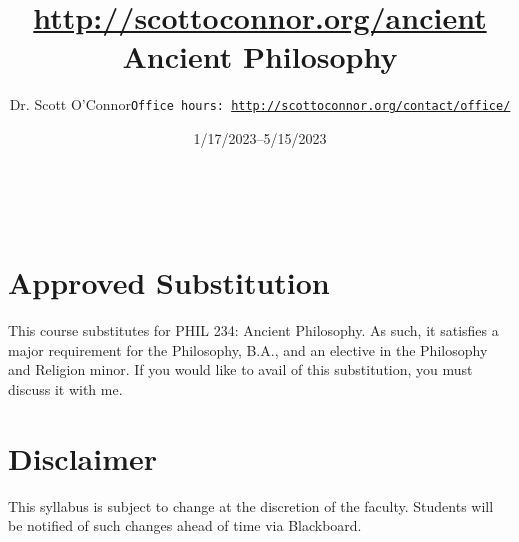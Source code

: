 \documentclass[article,oneside]{memoir}
\def\myauthor{Author}
\def\mytitle{Title}
\def\mycopyright{\myauthor}
\def\myweb{\href{http://scottoconnor.org/ancient}{http://scottoconnor.org/ancient}}
\def\myauthor{Dr. Scott O'Connor}
\def\mytitle{{\normalsize \myweb \newline} \HUGE Ancient Philosophy}
\begin{document}
\setsansfont[Mapping=tex-text]{Myriad Pro} 
\setmonofont[Mapping=tex-text,Scale=0.8]{Georgia} 

\def\ind{\hangindent=1 true cm\hangafter=1 \noindent}
\def\labelitemi{$\cdot$}


\title{\LARGE \mytitle}     
\author{\Large\myauthor \newline \footnotesize\texttt{\noindent Office hours: \href{http://scottoconnor.org/contact/office/}{http://scottoconnor.org/contact/office/}}}
\date{1/17/2023--5/15/2023}
\\


\maketitle




%
%

\section{Approved Substitution}

This course substitutes for PHIL 234: Ancient Philosophy. As such, it satisfies a major requirement for the Philosophy, B.A., and an elective in the Philosophy and Religion minor. If you would like to avail of this substitution, you must discuss it with me.

\section{Disclaimer}
 This syllabus is subject to change at the discretion of the faculty. Students will be notified of such changes ahead of time via Blackboard. 
\end{document}
